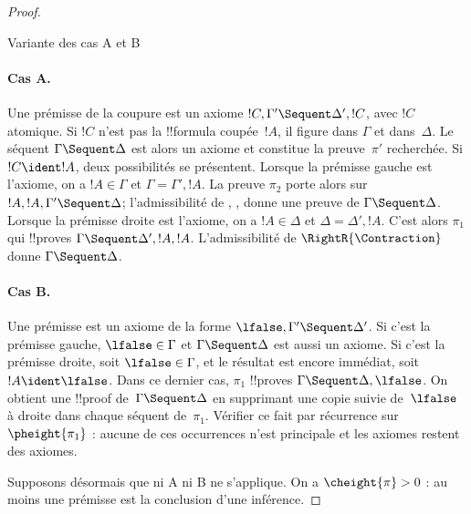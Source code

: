 \documentclass[../../../include/open-logic-section]{subfiles}
\begin{document}
\begin{proof}
\begin{center}
Variante des cas A et B
\end{center}

\paragraph{Cas A.}
Une prémisse de la coupure est un axiome
$!C,\Gamma'\Sequent\Delta',!C$, avec $!C$ atomique.
Si $!C$ n'est pas la !!{formula} coupée~$!A$, il figure
dans $\Gamma$ et dans~$\Delta$.
Le séquent $\Gamma\Sequent\Delta$ est alors un axiome
et constitue la preuve~$\pi'$ recherchée.
Si $!C\ident!A$, deux possibilités se présentent.
Lorsque la prémisse gauche est l'axiome, on a
$!A\in\Gamma$ et $\Gamma=\Gamma',!A$.
La preuve $\pi_2$ porte alors sur
$!A,!A,\Gamma'\Sequent\Delta$;
l'admissibilité de \LeftR{\Contraction},
, donne une preuve
de $\Gamma\Sequent\Delta$.
Lorsque la prémisse droite est l'axiome, on a
$!A\in\Delta$ et $\Delta=\Delta',!A$.
C'est alors $\pi_1$ qui !!{prove}s
$\Gamma\Sequent\Delta',!A,!A$.
L'admissibilité de $\RightR{\Contraction}$ donne
$\Gamma\Sequent\Delta$.

\paragraph{Cas B.}
Une prémisse est un axiome de la forme
$\lfalse,\Gamma'\Sequent\Delta'$.
Si c'est la prémisse gauche, $\lfalse\in\Gamma$
et $\Gamma\Sequent\Delta$ est aussi un axiome.
Si c'est la prémisse droite, soit $\lfalse\in\Gamma$,
et le résultat est encore immédiat, soit $!A\ident\lfalse$.
Dans ce dernier cas, $\pi_1$ !!{prove}s
$\Gamma\Sequent\Delta,\lfalse$.
On obtient une !!{proof} de~$\Gamma\Sequent\Delta$
en supprimant une copie suivie de~$\lfalse$ à droite
dans chaque séquent de~$\pi_1$.
Vérifier ce fait par récurrence sur~$\pheight{\pi_1}$ :
aucune de ces occurrences n'est principale et les axiomes
restent des axiomes.

Supposons désormais que ni A ni B ne s'applique.
On a $\cheight{\pi}>0$ : au moins une prémisse
est la conclusion d'une inférence.


\end{proof}
\end{document}
